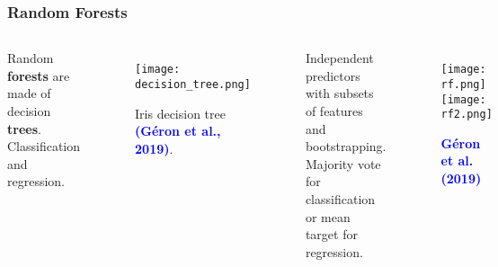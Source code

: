 \documentclass[11pt]{beamer}
\newcommand{\citat}[2]{\textbf{\textcolor{blue}{#1 et al. (#2)}}}
\newcommand{\citap}[2]{\textbf{\textcolor{blue}{(#1 et al., #2)}}}
\begin{document}
\begin{frame}
  \frametitle{\normalsize{\textbf{
        Random Forests
  }}} 

  \scriptsize{
    
    \begin{columns}

      \textbullet \: Random \textbf{forests} are made of decision
      \textbf{trees}. \\
      
      \textbullet \: Classification and regression. 

      \begin{figure}[h!]
        \centering
        \texttt{[image: decision\_tree.png]}
        \caption*{\scriptsize{
            Iris decision tree \citap{Géron}{2019}.
        }}
      \end{figure}
      

      \textbullet \: Independent predictors with subsets of features and
      bootstrapping.  \\

      \textbullet \: Majority vote for classification or mean target for regression.
      
      \begin{figure}[h!]
        \centering
        \texttt{[image: rf.png]}\\
        \texttt{[image: rf2.png]}
        \caption*{\scriptsize{
            \citat{Géron}{2019}
        }}
      \end{figure}
      
    \end{columns}
  }  
  
\end{frame}
\end{document}

